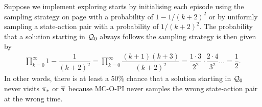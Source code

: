 Suppose we implement exploring starts by
initialising each episode using the sampling strategy on page \pageref{pg: sampling strat 3 states}
with a probability of $1-1/(k+2)^2$ or by uniformly sampling a state-action pair with a probability of $1/(k+2)^2$. The probability that a solution starting in $\mathcal{Q}_0$ always follows the sampling strategy is then given by
\begin{align*}
    \prod_{k = 0}^{\infty} 1 - \dfrac{1}{(k+2)^2}
    = \prod_{k = 0}^{\infty} \dfrac{(k+1)(k+3)}{(k+2)^2}
    = \dfrac{1 \cdot 3}{2^2} \cdot \dfrac{2 \cdot 4}{3^2} 
    \dots
    = \dfrac{1}{2} .
\end{align*}
In other words, there is at least a 50\% chance that a solution starting in $\mathcal{Q}_0$ never visits ${\pi}_*$ or $\overline{\pi}$ because MC-O-PI never samples the wrong state-action pair at the wrong time.





